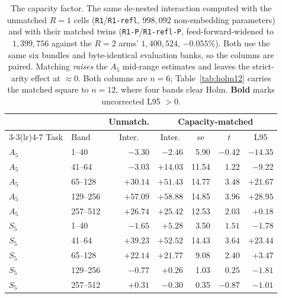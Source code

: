 \documentclass[10pt,twocolumn]{article}
\newcommand{\hd}[1]{\multicolumn{1}{c}{#1}}
\begin{document}
\begin{table}[t]
\centering
\small
\caption{The capacity factor. The same de-nested interaction computed with the
unmatched $R{=}1$ cells (\texttt{R1}/\texttt{R1-refl}, $998{,}092$ non-embedding
parameters) and with their matched twins
(\texttt{R1-P}/\texttt{R1-refl-P}, feed-forward-widened to $1{,}399{,}756$
against the $R{=}2$ arms' $1{,}400{,}524$, $-0.055\%$). Both use the same six
bundles and byte-identical evaluation banks, so the columns are paired.
Matching \emph{raises} the $A_5$ mid-range estimates and leaves the strict-arity
effect at $\approx0$. Both columns are $n=6$; Table~\ref{tab:holm12} carries the
matched square to $n=12$, where four bands clear Holm. \textbf{Bold} marks
uncorrected L95 $>0$.}
\label{tab:matched}
\footnotesize
\setlength{\tabcolsep}{3.6pt}
\begin{tabular}{llrrrrr}
\toprule
& & \multicolumn{1}{c}{Unmatch.} & \multicolumn{4}{c}{Capacity-matched} \\
\cmidrule(lr){3-3}\cmidrule(lr){4-7}
Task & Band & \hd{Inter.} & \hd{Inter.} & \hd{se} & \hd{$t$} & \hd{L95} \\
\midrule
$A_5$ & 1--40    & $-3.30$ & $-2.46$ & 5.90 & $-0.42$ & $-14.35$ \\
$A_5$ & 41--64   & $-3.03$ & $+14.03$ & 11.54 & $1.22$ & $-9.22$ \\
$A_5$ & 65--128  & $+30.14$ & $\mathbf{+51.43}$ & 14.77 & $3.48$ & $\mathbf{+21.67}$ \\
$A_5$ & 129--256 & $+57.09$ & $\mathbf{+58.88}$ & 14.85 & $3.96$ & $\mathbf{+28.95}$ \\
$A_5$ & 257--512 & $+26.74$ & $\mathbf{+25.42}$ & 12.53 & $2.03$ & $\mathbf{+0.18}$ \\
\midrule
$S_5$ & 1--40    & $-1.65$ & $+5.28$ & 3.50 & $1.51$ & $-1.78$ \\
$S_5$ & 41--64   & $+39.23$ & $\mathbf{+52.52}$ & 14.43 & $3.64$ & $\mathbf{+23.44}$ \\
$S_5$ & 65--128  & $+22.14$ & $\mathbf{+21.77}$ & 9.08 & $2.40$ & $\mathbf{+3.47}$ \\
$S_5$ & 129--256 & $-0.77$ & $+0.26$ & 1.03 & $0.25$ & $-1.81$ \\
$S_5$ & 257--512 & $+0.31$ & $-0.30$ & 0.35 & $-0.87$ & $-1.01$ \\
\bottomrule
\end{tabular}
\end{table}
\end{document}
